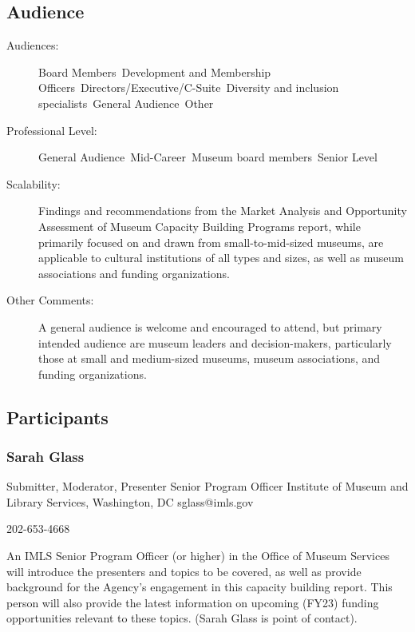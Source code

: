 \documentclass{report}
\begin{document}
              \subsection*{Audience}
                \begin{description}
                  \item [Audiences:]Board Members~Development and Membership Officers~Directors/Executive/C-Suite~Diversity and inclusion specialists~General Audience~Other~
                  \item[Professional Level:]General Audience~Mid-Career~Museum board members~Senior Level~
                \item[Scalability:] Findings and recommendations from the Market Analysis and Opportunity Assessment of Museum Capacity Building Programs report, while primarily focused on and drawn from small-to-mid-sized museums, are applicable to cultural institutions of all types and sizes, as well as museum associations and funding organizations.

							
              \item[Other Comments:] A general audience is welcome and encouraged to attend, but primary intended audience are museum leaders and decision-makers, particularly those at small and medium-sized museums, museum associations, and funding organizations.
              \end{description}
            \subsection*{Participants}
              \subsubsection*{ Sarah Glass }
              Submitter, Moderator, Presenter\newline
              Senior Program Officer\newline
              Institute of Museum and Library Services, Washington, DC
              \newline
              sglass@imls.gov\newline
              
              202-653-4668\newline

              An IMLS Senior Program Officer (or higher) in the Office of Museum Services will introduce the presenters and topics to be covered, as well as provide background for the Agency’s engagement in this capacity building report. This person will also provide the latest information on upcoming (FY23) funding opportunities relevant to these topics. (Sarah Glass is point of contact).\newline
\end{document}
